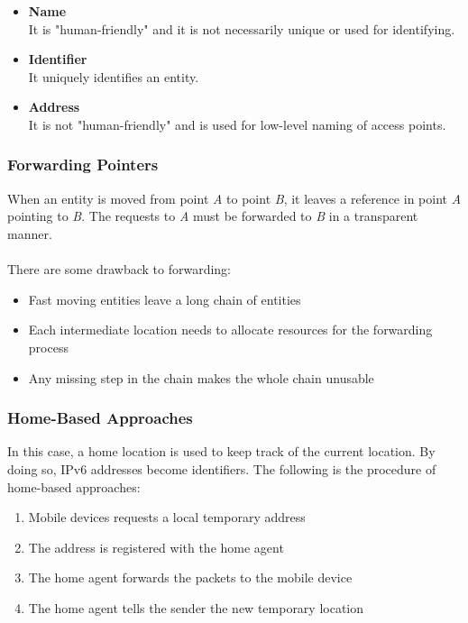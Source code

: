 \documentclass{article}
\begin{document}
\begin{itemize}
	\item \textbf{Name} \\
	It is "human-friendly" and it is not necessarily unique or used for identifying.
	
	\item \textbf{Identifier} \\
	It uniquely identifies an entity.
	
	\item \textbf{Address} \\
	It is not "human-friendly" and is used for low-level naming of access points.
\end{itemize}

\subsubsection{Forwarding Pointers}
When an entity is moved from point \textit{A} to point \textit{B}, it leaves a reference in point \textit{A} pointing to \textit{B}. The requests to \textit{A} must be forwarded to \textit{B} in a transparent manner. \\ \\
There are some drawback to forwarding:

\begin{itemize}
	\item Fast moving entities leave a long chain of entities
	\item Each intermediate location needs to allocate resources for the forwarding process
	\item Any missing step in the chain makes the whole chain unusable
\end{itemize}

\subsubsection{Home-Based Approaches}
In this case, a home location is used to keep track of the current location. By doing so, IPv6 addresses become identifiers. The following is the procedure of home-based approaches:

\begin{enumerate}
	\item Mobile devices requests a local temporary address
	\item The address is registered with the home agent
	\item The home agent forwards the packets to the mobile device
	\item The home agent tells the sender the new temporary location
\end{enumerate}
\end{document}
